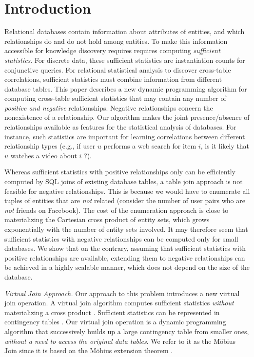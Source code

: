\documentclass{acm_proc_article-sp}
\begin{document}

 
\section{Introduction} Relational databases contain information about attributes of entities, and which relationships do and do not hold among entities. To make this information accessible for knowledge discovery requires requires computing {\em sufficient statistics}. For discrete data, these sufficient statistics are instantiation counts for conjunctive queries. 
For relational statistical analysis to discover cross-table correlations,  sufficient statistics must combine information from different database tables. This paper describes a new dynamic programming algorithm for computing cross-table sufficient statistics that may contain any number of {\em positive and negative} relationships. Negative relationships concern the nonexistence of a relationship. Our algorithm makes the joint presence/absence of relationships available as features for the statistical analysis of databases. For instance, such statistics are important for learning correlations between different relationship types (e.g., if user $u$ performs a web search for item $i$, is it likely that $u$ watches a video about $i$ ?). 

Whereas sufficient statistics with positive relationships only can be efficiently computed by SQL joins of existing database tables, a table join approach is not feasible for negative relationships. This is because we would have to enumerate all tuples of entities that are {\em not} related (consider the number of user pairs who are {\em not} friends on Facebook). The cost of the enumeration approach is close to materializing the Cartesian cross product of entity sets, which grows exponentially with the number of entity sets involved. It may therefore seem that sufficient statistics with negative relationships can be computed only for small databases. 
We show that on the contrary, assuming that sufficient statistics with positive relationships are available, extending them to negative relationships can be achieved in a highly scalable manner, which does not depend on the size of the database.

\emph{Virtual Join Approach.} Our approach to this problem introduces a new virtual join operation. A virtual join algorithm computes sufficient statistics {\em without} materializing a cross product \cite{Yin2004}. Sufficient statistics can be represented in contingency tables \cite{Moore1998}. Our virtual join operation is a dynamic programming algorithm that successively builds up a large contingency table from smaller ones, {\em without a need to access the original data tables}. We refer to it as the M\"obius Join since it is based on the M\"obius extension theorem \cite{Schulte2014}.
\end{document}
